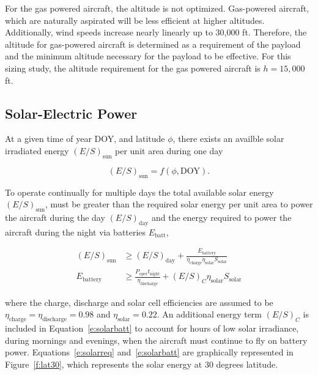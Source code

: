 \documentclass[]{aiaa-tc}%
\begin{document}
For the gas powered aircraft, the altitude is not optimized.  
Gas-powered aircraft, which are naturally aspirated will be less efficient at higher altitudes.  
Additionally, wind speeds increase nearly linearly up to 30,000 ft.  
Therefore, the altitude for gas-powered aircraft is determined as a requirement of the payload and the minimum altitude necessary for the payload to be effective.\cite{orion}
For this sizing study, the altitude requirement for the gas powered aircraft is $h=15,000$ ft.

\subsection{Solar-Electric Power}

At a given time of year DOY, and latitude $\phi$, there exists an availble solar irradiated energy $(E/S)_{\text{sun}}$ per unit area during one day

\begin{equation}
    \label{e:solarfunc}
    (E/S)_{\text{sun}} = f(\phi, \text{DOY}).
\end{equation}

To operate continually for multiple days the total available solar energy $(E/S)_{\text{sun}}$, must be greater than the required solar energy per unit area to power the aircraft during the day $(E/S)_{\text{day}}$ and the energy required to power the aircraft during the night via batteries $E_{\text{batt}}$,\cite{solartech}

\begin{align}
    \label{e:solarreq}
    (E/S)_{\text{sun}}  &\geq (E/S)_{\text{day}} + \frac{E_{\text{battery}}}{\eta_{\text{charge}}\eta_{\text{solar}} S_{\text{solar}}} \\
    \label{e:solarbatt}
    E_{\text{battery}} &\geq \frac{P_{\text{oper}}t_{\text{night}}}{\eta_{\text{discharge}}} + (E/S)_C \eta_{\text{solar}} S_{\text{solar}}
\end{align}

where the charge, discharge and solar cell efficiencies are assumed to be $\eta_{\text{charge}} = \eta_{\text{discharge}} = 0.98$ and $\eta_{\text{solar}}= 0.22$. 
An additional energy term $(E/S)_C$ is included in Equation~\ref{e:solarbatt} to account for hours of low solar irradiance, during mornings and evenings, when the aircraft must continue to fly on battery power. 
Equations~\ref{e:solarreq} and~\ref{e:solarbatt} are graphically represented in Figure~\ref{f:lat30}, which represents the solar energy at 30 degrees latitude. 
\end{document}
